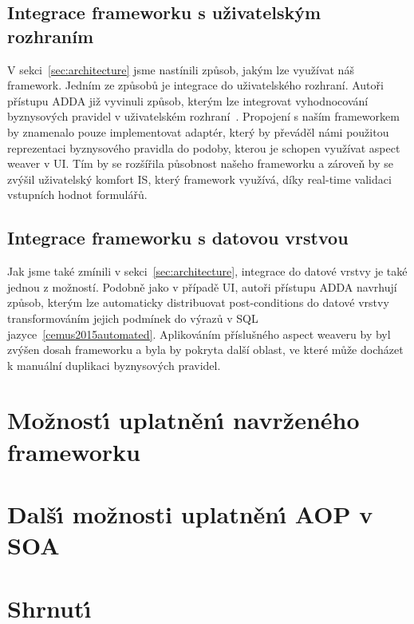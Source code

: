 \subsection{Integrace frameworku s uživatelským rozhraním}

V sekci~\ref{sec:architecture} jsme nastínili způsob, jakým lze využívat náš framework.
Jedním ze způsobů je integrace do uživatelského rozhraní. Autoři přístupu \gls{ADDA} již
vyvinuli způsob, kterým lze integrovat vyhodnocování
byznysových pravidel v uživatelském rozhraní~\cite{cemus2017separation}. Propojení s
naším frameworkem by znamenalo pouze implementovat adaptér, který by převáděl námi
použitou reprezentaci byznysového pravidla do podoby, kterou je schopen využívat
aspect weaver v \gls{UI}. Tím by se rozšířila působnost našeho frameworku a zároveň
by se zvýšil uživatelský komfort \gls{IS}, který framework využívá, díky real-time
validaci vstupních hodnot formulářů.

\subsection{Integrace frameworku s datovou vrstvou}

Jak jsme také zmínili v sekci~\ref{sec:architecture}, integrace do datové vrstvy
je také jednou z možností. Podobně jako v případě \gls{UI}, autoři přístupu
\gls{ADDA} navrhují způsob, kterým lze automaticky distribuovat post-conditions
do datové vrstvy transformováním jejich podmínek do výrazů v \gls{SQL}
jazyce~\ref{cemus2015automated}. Aplikováním příslušného aspect weaveru by byl
zvýšen dosah frameworku a byla by pokryta další oblast, ve které může docházet
k manuální duplikaci byznysových pravidel.

\section{Možnost\'{\i} uplatněn\'{\i} navrženého frameworku}

\section{Dalš\'{\i} možnosti uplatněn\'{\i} \gls{AOP} v \gls{SOA}}


\section{Shrnut\'{\i}}

